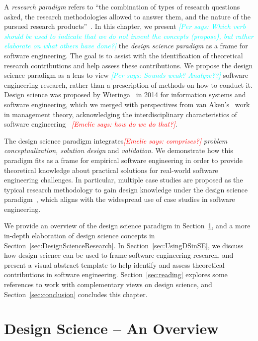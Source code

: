 \documentclass[graybox]{svmult}
\newcommand{\emelie}[1]{\textcolor{red}{{\it [Emelie says: #1]}}}
\newcommand{\per}[1]{\textcolor{cyan}{{\it [Per says: #1]}}}
\newcommand{\emelie}[1]{}
\newcommand{\per}[1]{}
\begin{document}
A \emph{research paradigm} refers to ``the combination of types of research questions asked, the research methodologies allowed to answer them, and the nature of the pursued research products''~\cite{van_aken_management_2004}. In this chapter, we present \per{Which verb should be used to indicate that we do not invent the concepts (propose), but rather elaborate on what others have done?} the \emph{design science paradigm} as a frame for software engineering. The goal is to assist with the identification of theoretical research contributions and help assess these contributions. We propose the design science paradigm as a lens to view \per{Sounds weak? Analyze??} software engineering research, rather than a prescription of methods on how to conduct it. 
Design science was proposed by Wieringa~\cite{wieringa_what_2014} in 2014 for information systems and software engineering, which we merged with perspectives from van Aken's~\cite{van_aken_management_2004} work in management theory, acknowledging the interdisciplinary characteristics of software engineering~\cite{Mendez2019} \emelie{how do we do that?}.

The design science paradigm integrates\emelie{comprises?} \emph{problem conceptualization, solution design} and \emph{validation}. We demonstrate how this paradigm fits as a frame for empirical software engineering in order to provide theoretical knowledge about practical solutions for real-world software engineering challenges. In particular, multiple case studies are proposed as the typical research methodology to gain design knowledge under the design science paradigm~\cite{van_aken_management_2004}, which aligns with the widespread use of case studies in software engineering. 

We provide an overview of the design science paradigm in Section~\ref{sec:overview}, and a more in-depth elaboration of design science concepts in Section~\ref{sec:DesignScienceResearch}. In Section~\ref{sec:UsingDSinSE}, we discuss how design science can be used to frame software engineering research, and present a visual abstract template to help identify and assess theoretical contributions in software engineering. Section~\ref{sec:reading} explores some references to work with complementary views on design science, and Section~\ref{sec:conclusion} concludes this chapter.


\section{Design Science -- An Overview}
\label{sec:overview}
\end{document}
